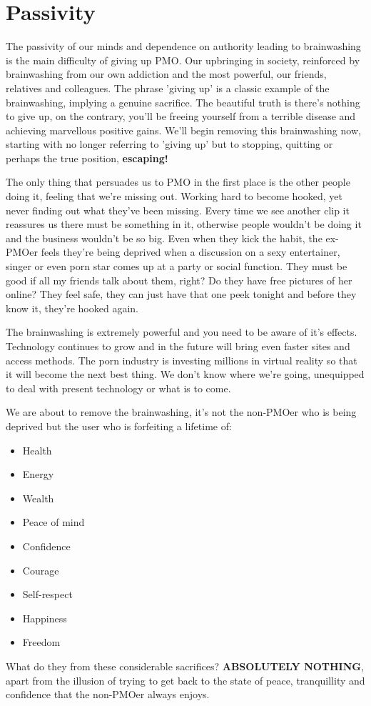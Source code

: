 \documentclass[easypeasy.tex]{subfiles}
\begin{document}
\section{Passivity}
The passivity of our minds and dependence on authority leading to brainwashing is the main difficulty of giving up PMO. Our upbringing in society, reinforced by brainwashing from our own addiction and the most powerful, our friends, relatives and colleagues. The phrase 'giving up' is a classic example of the brainwashing, implying a genuine sacrifice. The beautiful truth is there's nothing to give up, on the contrary, you'll be freeing yourself from a terrible disease and achieving marvellous positive gains. We'll begin removing this brainwashing now, starting with no longer referring to 'giving up' but to stopping, quitting or perhaps the true position, \textbf{escaping!}

The only thing that persuades us to PMO in the first place is the other people doing it, feeling that we're missing out. Working hard to become hooked, yet never finding out what they've been missing. Every time we see another clip it reassures us there must be something in it, otherwise people wouldn't be doing it and the business wouldn't be so big. Even when they kick the habit, the ex-PMOer feels they're being deprived when a discussion on a sexy entertainer, singer or even  porn star comes up at a party or social function. They must be good if all my friends talk about them, right? Do they have free pictures of her online? They feel safe, they can just have that one peek tonight and before they know it, they're hooked again.

The brainwashing is extremely powerful and you need to be aware of it's effects. Technology continues to grow and in the future will bring even faster sites and access methods. The porn industry is investing millions in virtual reality so that it will become the next best thing. We don't know where we're going, unequipped to deal with present technology or what is to come.

We are about to remove the brainwashing, it's not the non-PMOer who is being deprived but the user who is forfeiting a lifetime of:
\begin{itemize}
  \item Health
  \item Energy
  \item Wealth
  \item Peace of mind
  \item Confidence
  \item Courage
  \item Self-respect
  \item Happiness
  \item Freedom
\end{itemize}
What do they from these considerable sacrifices? \textbf{ABSOLUTELY NOTHING}, apart from the illusion of trying to get back to the state of peace, tranquillity and confidence that the non-PMOer always enjoys.
\end{document}
